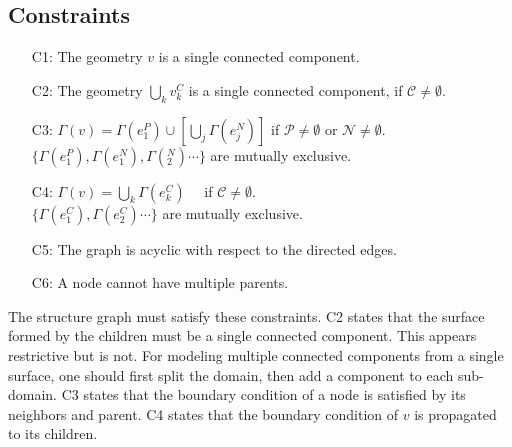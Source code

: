 \subsection{Constraints}
%
\begin{enumerate}[itemsep=0mm]
 \item[C1:] The geometry $v$ is a single connected component.
 \item[C2:] The geometry $\bigcup_k v^C_k$ is a single connected
            component, if $\mathcal{C}\ne \emptyset$.
 \item[C3:] $\Gamma(v) = \Gamma(e^P_1) \cup
            \left[\bigcup_j \Gamma(e^N_j)\right]$ if
            $\mathcal{P}\ne \emptyset$  or $\mathcal{N} \ne \emptyset$.\\
  $\{\Gamma(e^P_1), \Gamma(e^N_1), \Gamma(^N_2) \cdots \}$ are mutually
            exclusive.
 \item[C4:] $\Gamma(v) = \bigcup_k \Gamma(e^C_k)\quad $ if $\mathcal{C} \ne \emptyset.$\\
            $\{\Gamma(e^C_1), \Gamma(e^C_2) \cdots\}$ are mutually exclusive.
 \item[C5:] The graph is acyclic with respect to the directed edges.
 \item[C6:] A node cannot have multiple parents.
\end{enumerate}

The structure graph must satisfy these constraints.
C2 states that the surface formed by the children must be a single connected
component. This appears restrictive but is not.
For modeling multiple connected components from a single surface, one
should first split the domain, then add a component to each sub-domain.
%
C3 states that the boundary condition of a node is satisfied by
its neighbors and parent.
%
C4 states that the boundary condition of $v$ is propagated to its
children.

